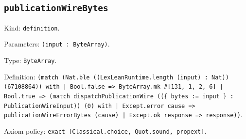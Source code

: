 \documentclass[11pt]{article}
\begin{document}
\subsection*{\texttt{publicationWireBytes}}
\noindent Kind: \texttt{definition}.\par
\noindent Parameters: \texttt{(input : ByteArray)}.\par
\noindent Type: \texttt{ByteArray}.\par
\noindent Definition: \texttt{(match (Nat.ble ((LexLeanRuntime.length (input) : Nat)) (67108864)) with | Bool.false => ByteArray.mk \#[131, 1, 2, 6] | Bool.true => (match dispatchPublicationWire ((\{ bytes := input \} : PublicationWireInput)) (0) with | Except.error cause => publicationWireErrorBytes (cause) | Except.ok response => response))}.\par
\noindent Axiom policy: \texttt{exact [Classical.choice, Quot.sound, propext]}.\par
\end{document}
